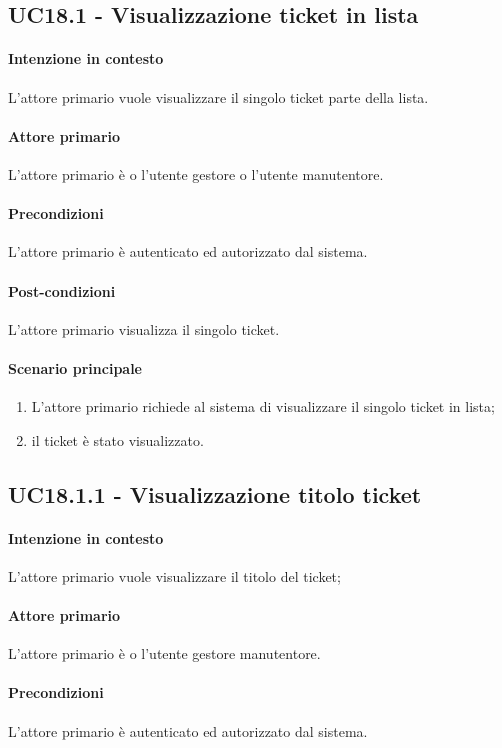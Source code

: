 \subsection{UC18.1 - Visualizzazione ticket in lista}\label{uc:18.1}
\paragraph{Intenzione in contesto} L'attore primario vuole visualizzare il singolo ticket parte della lista.
\paragraph{Attore primario} L'attore primario è o l'utente gestore o l'utente manutentore.
\paragraph{Precondizioni}  L'attore primario è autenticato ed autorizzato dal sistema.
\paragraph{Post-condizioni} L'attore primario visualizza il singolo ticket.
\paragraph{Scenario principale}
\begin{enumerate}
    \item L'attore primario richiede al sistema di visualizzare il singolo ticket in lista;
    \item il ticket è stato visualizzato.
\end{enumerate}

\subsection{UC18.1.1 - Visualizzazione titolo ticket}\label{uc:18.1.1}

\paragraph{Intenzione in contesto} L'attore primario vuole visualizzare il titolo del ticket;
\paragraph{Attore primario} L'attore primario è o l'utente gestore manutentore.
\paragraph{Precondizioni}  L'attore primario è autenticato ed autorizzato dal sistema.
